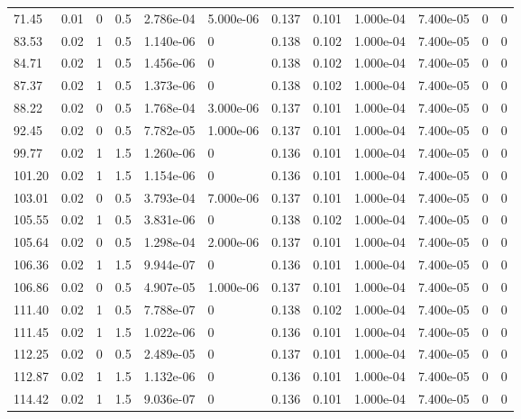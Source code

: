 \documentclass[preview]{standalone}
\begin{document}
{{\begin{tabular}{L{1.2cm}C{1.2cm} C{0.3cm}C{0.5cm} C{1.4cm}C{1.4cm} C{1.4cm}C{1.4cm} C{1.6cm}C{1.6cm} C{1.6cm}C{1.6cm}}
  71.45  &  0.01  & 0     & 0.5 &  2.786e-04  & 5.000e-06  &  0.137&   0.101& 1.000e-04 & 7.400e-05   &  0 & 0  \\ 
  83.53  &  0.02  & 1     & 0.5 &  1.140e-06  & 0  &  0.138&   0.102& 1.000e-04 & 7.400e-05   &  0 & 0  \\ 
  84.71  &  0.02  & 1     & 0.5 &  1.456e-06  & 0  &  0.138&   0.102& 1.000e-04 & 7.400e-05   &  0 & 0  \\ 
  87.37  &  0.02  & 1     & 0.5 &  1.373e-06  & 0  &  0.138&   0.102& 1.000e-04 & 7.400e-05   &  0 & 0  \\ 
  88.22  &  0.02  & 0     & 0.5 &  1.768e-04  & 3.000e-06  &  0.137&   0.101& 1.000e-04 & 7.400e-05   &  0 & 0  \\ 
  92.45  &  0.02  & 0     & 0.5 &  7.782e-05  & 1.000e-06  &  0.137&   0.101& 1.000e-04 & 7.400e-05   &  0 & 0  \\ 
  99.77  &  0.02  & 1     & 1.5 &  1.260e-06  & 0  &  0.136&   0.101& 1.000e-04 & 7.400e-05   &  0 & 0  \\ 
  101.20  &  0.02  & 1     & 1.5 &  1.154e-06  & 0  &  0.136&   0.101& 1.000e-04 & 7.400e-05   &  0 & 0  \\ 
  103.01  &  0.02  & 0     & 0.5 &  3.793e-04  & 7.000e-06  &  0.137&   0.101& 1.000e-04 & 7.400e-05   &  0 & 0  \\ 
  105.55  &  0.02  & 1     & 0.5 &  3.831e-06  & 0  &  0.138&   0.102& 1.000e-04 & 7.400e-05   &  0 & 0  \\ 
  105.64  &  0.02  & 0     & 0.5 &  1.298e-04  & 2.000e-06  &  0.137&   0.101& 1.000e-04 & 7.400e-05   &  0 & 0  \\ 
  106.36  &  0.02  & 1     & 1.5 &  9.944e-07  & 0  &  0.136&   0.101& 1.000e-04 & 7.400e-05   &  0 & 0  \\ 
  106.86  &  0.02  & 0     & 0.5 &  4.907e-05  & 1.000e-06  &  0.137&   0.101& 1.000e-04 & 7.400e-05   &  0 & 0  \\ 
  111.40  &  0.02  & 1     & 0.5 &  7.788e-07  & 0  &  0.138&   0.102& 1.000e-04 & 7.400e-05   &  0 & 0  \\ 
  111.45  &  0.02  & 1     & 1.5 &  1.022e-06  & 0  &  0.136&   0.101& 1.000e-04 & 7.400e-05   &  0 & 0  \\ 
  112.25  &  0.02  & 0     & 0.5 &  2.489e-05  & 0  &  0.137&   0.101& 1.000e-04 & 7.400e-05   &  0 & 0  \\ 
  112.87  &  0.02  & 1     & 1.5 &  1.132e-06  & 0  &  0.136&   0.101& 1.000e-04 & 7.400e-05   &  0 & 0  \\ 
  114.42  &  0.02  & 1     & 1.5 &  9.036e-07  & 0  &  0.136&   0.101& 1.000e-04 & 7.400e-05   &  0 & 0  \\ 

\end{tabular}}}
\end{document}
